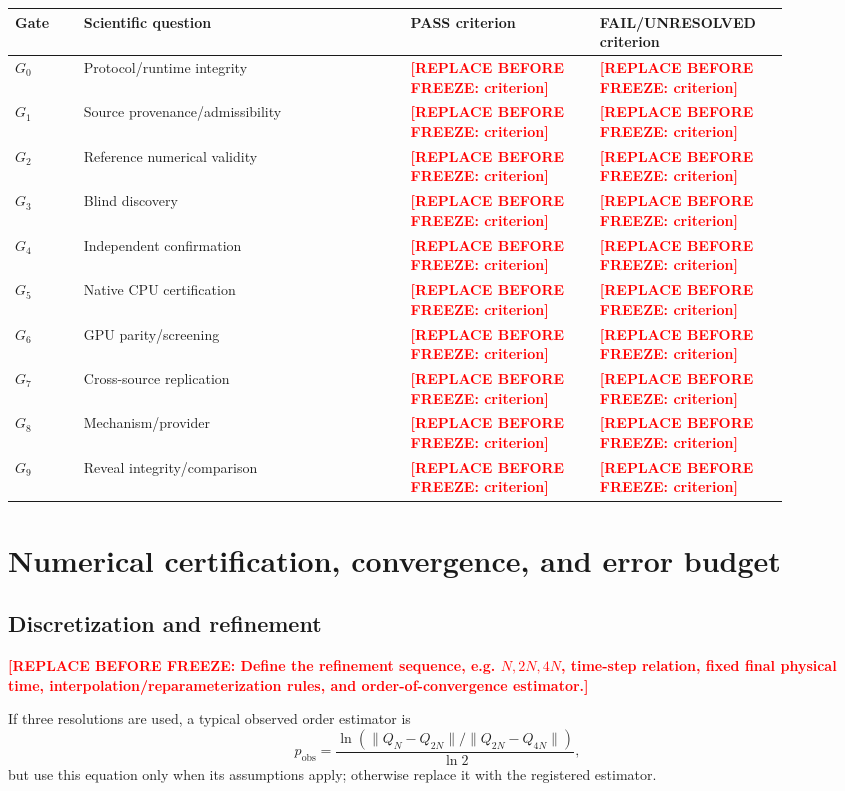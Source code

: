 \documentclass[11pt,a4paper]{article}
\newcommand{\SSTTODO}[1]{\ifmmode\text{\color{red}\bfseries TODO}\else\textcolor{red}{\textbf{[REPLACE BEFORE FREEZE: #1]}}\fi}
\begin{document}
\begin{longtable}{p{0.08\linewidth}p{0.38\linewidth}p{0.22\linewidth}p{0.22\linewidth}}
\toprule
Gate & Scientific question & PASS criterion & FAIL/UNRESOLVED criterion \\
\midrule
$G_0$ & Protocol/runtime integrity & \SSTTODO{criterion} & \SSTTODO{criterion} \\
$G_1$ & Source provenance/admissibility & \SSTTODO{criterion} & \SSTTODO{criterion} \\
$G_2$ & Reference numerical validity & \SSTTODO{criterion} & \SSTTODO{criterion} \\
$G_3$ & Blind discovery & \SSTTODO{criterion} & \SSTTODO{criterion} \\
$G_4$ & Independent confirmation & \SSTTODO{criterion} & \SSTTODO{criterion} \\
$G_5$ & Native CPU certification & \SSTTODO{criterion} & \SSTTODO{criterion} \\
$G_6$ & GPU parity/screening & \SSTTODO{criterion} & \SSTTODO{criterion} \\
$G_7$ & Cross-source replication & \SSTTODO{criterion} & \SSTTODO{criterion} \\
$G_8$ & Mechanism/provider & \SSTTODO{criterion} & \SSTTODO{criterion} \\
$G_9$ & Reveal integrity/comparison & \SSTTODO{criterion} & \SSTTODO{criterion} \\
\bottomrule
\end{longtable}

\section{Numerical certification, convergence, and error budget}
\subsection{Discretization and refinement}
\SSTTODO{Define the refinement sequence, e.g. $N,2N,4N$, time-step relation, fixed final physical time, interpolation/reparameterization rules, and order-of-convergence estimator.}

If three resolutions are used, a typical observed order estimator is
\begin{equation}
 p_{\mathrm{obs}}=\frac{\ln\!\left(\|Q_N-Q_{2N}\|/\|Q_{2N}-Q_{4N}\|\right)}{\ln 2},
\end{equation}
but use this equation only when its assumptions apply; otherwise replace it with the registered estimator.
\end{document}
